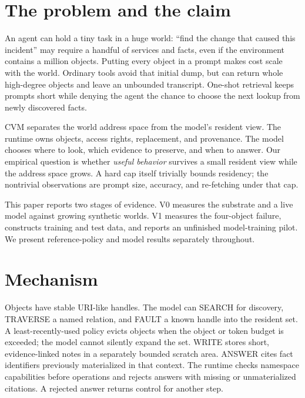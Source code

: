 \documentclass[10pt,letterpaper]{article}
\newcommand{\cvm}{\textsc{CVM}}
\newcommand{\op}[1]{\textsf{#1}}
\begin{document}
\section{The problem and the claim}

An agent can hold a tiny task in a huge world: ``find the change that caused this incident'' may require a handful of services and facts, even if the environment contains a million objects. Putting every object in a prompt makes cost scale with the world. Ordinary tools avoid that initial dump, but can return whole high-degree objects and leave an unbounded transcript. One-shot retrieval keeps prompts short while denying the agent the chance to choose the next lookup from newly discovered facts.

\cvm{} separates the world address space from the model's resident view. The runtime owns objects, access rights, replacement, and provenance. The model chooses where to look, which evidence to preserve, and when to answer. Our empirical question is whether \emph{useful behavior} survives a small resident view while the address space grows. A hard cap itself trivially bounds residency; the nontrivial observations are prompt size, accuracy, and re-fetching under that cap.

This paper reports two stages of evidence. V0 measures the substrate and a live model against growing synthetic worlds. V1 measures the four-object failure, constructs training and test data, and reports an unfinished model-training pilot. We present reference-policy and model results separately throughout.

\section{Mechanism}

Objects have stable URI-like handles. The model can \op{SEARCH} for discovery, \op{TRAVERSE} a named relation, and \op{FAULT} a known handle into the resident set. A least-recently-used policy evicts objects when the object or token budget is exceeded; the model cannot silently expand the set. \op{WRITE} stores short, evidence-linked notes in a separately bounded scratch area. \op{ANSWER} cites fact identifiers previously materialized in that context. The runtime checks namespace capabilities before operations and rejects answers with missing or unmaterialized citations. A rejected answer returns control for another step.
\end{document}
